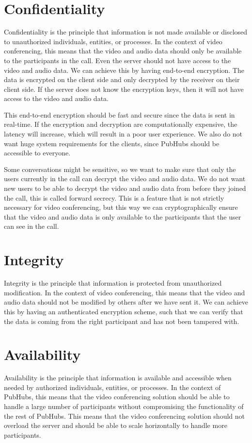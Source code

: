 \documentclass{report}
\begin{document}
\section{Confidentiality}
Confidentiality is the principle that information is not made available or disclosed to unauthorized individuals,
entities, or processes. In the context of video conferencing, this means that the video and audio data should only
be available to the participants in the call. Even the server should not have access to the video and audio data. We
can achieve this by having end-to-end encryption. The data is encrypted on the client side and only decrypted by
the receiver on their client side. If the server does not know the encryption keys, then it will not have access to
the video and audio data.

This end-to-end encryption should be fast and secure since the data is sent in real-time. If the encryption and
decryption are computationally expensive, the latency will increase, which will result in a poor user experience. We
also do not want huge system requirements for the clients, since PubHubs should be accessible to everyone.

Some conversations might be sensitive, so we want to make sure that only the users currently in the call can
decrypt the video and audio data. We do not want new users to be able to decrypt the video and audio data from
before they joined the call, this is called forward secrecy. This is a feature that is not strictly necessary for
video conferencing, but this way we can cryptographically ensure that the video and audio data is only available to
the participants that the user can see in the call.

\section{Integrity}
Integrity is the principle that information is protected from unauthorized modification. In the context of video
conferencing, this means that the video and audio data should not be modified by others after we have sent it. We can
achieve this by having an authenticated encryption scheme, such that we can verify that the data is coming from the
right participant and has not been tampered with.

\section{Availability}
Availability is the principle that information is available and accessible when needed by authorized individuals,
entities, or processes. In the context of PubHubs, this means that the video conferencing solution should be able to
handle a large number of participants without compromising the functionality of the rest of PubHubs. This means that
the video conferencing solution should not overload the server and should be able to scale horizontally to handle
more participants.
\end{document}
